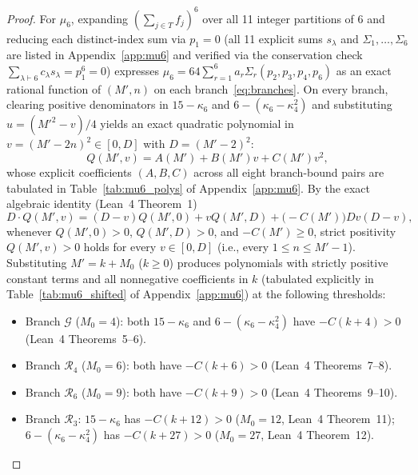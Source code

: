 \documentclass[11pt,a4paper]{article}
\theoremstyle{remark}
\begin{document}
\begin{proof}
For $\mu_6$, expanding $(\sum_{j\in T} f_j)^6$ over all 11 integer partitions of $6$ and reducing each distinct-index sum via $p_1 = 0$ (all 11 explicit sums $s_\lambda$ and $\Sigma_1,\dots,\Sigma_6$ are listed in Appendix~\ref{app:mu6} and verified via the conservation check $\sum_{\lambda \vdash 6} c_\lambda s_\lambda = p_1^6 = 0$) expresses $\mu_6 = 64 \sum_{r=1}^6 a_r \Sigma_r(p_2, p_3, p_4, p_6)$ as an exact rational function of $(M', n)$ on each branch~\eqref{eq:branches}. On every branch, clearing positive denominators in $15 - \kappa_6$ and $6 - (\kappa_6 - \kappa_4^2)$ and substituting $u = (M'^2 - v)/4$ yields an exact quadratic polynomial in $v = (M'-2n)^2 \in [0, D]$ with $D = (M'-2)^2$:
\begin{equation}
Q(M', v) = A(M') + B(M') v + C(M') v^2,
\end{equation}
whose explicit coefficients $(A, B, C)$ across all eight branch-bound pairs are tabulated in Table~\ref{tab:mu6_polys} of Appendix~\ref{app:mu6}. By the exact algebraic identity (Lean~4 Theorem~1)
\begin{equation}
\label{eq:concave_id}
D \cdot Q(M', v) = (D - v) Q(M', 0) + v Q(M', D) + \bigl(-C(M')\bigr) D v (D - v),
\end{equation}
whenever $Q(M', 0) > 0$, $Q(M', D) > 0$, and $-C(M') \ge 0$, strict positivity $Q(M', v) > 0$ holds for every $v \in [0, D]$ (i.e., every $1 \le n \le M'-1$). Substituting $M' = k + M_0$ ($k \ge 0$) produces polynomials with strictly positive constant terms and all nonnegative coefficients in $k$ (tabulated explicitly in Table~\ref{tab:mu6_shifted} of Appendix~\ref{app:mu6}) at the following thresholds:
\begin{itemize}
\item Branch $\mathcal{G}$ ($M_0 = 4$): both $15 - \kappa_6$ and $6 - (\kappa_6 - \kappa_4^2)$ have $-C(k+4) > 0$ (Lean~4 Theorems~5--6).
\item Branch $\mathcal{R}_4$ ($M_0 = 6$): both have $-C(k+6) > 0$ (Lean~4 Theorems~7--8).
\item Branch $\mathcal{R}_6$ ($M_0 = 9$): both have $-C(k+9) > 0$ (Lean~4 Theorems~9--10).
\item Branch $\mathcal{R}_3$: $15 - \kappa_6$ has $-C(k+12) > 0$ ($M_0 = 12$, Lean~4 Theorem~11); $6 - (\kappa_6 - \kappa_4^2)$ has $-C(k+27) > 0$ ($M_0 = 27$, Lean~4 Theorem~12).
\end{itemize}

\end{proof}
\end{document}
